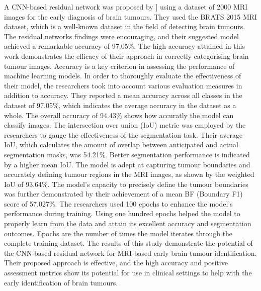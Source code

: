 \documentclass[12pt, a4paper,twoside]{report}
\theoremstyle{plain} %
\theoremstyle{definition} %
\theoremstyle{remark} %
\numberwithin{equation}{chapter}
\begin{document}
A CNN-based residual network was proposed by \cite{obeidavi22}] using a dataset of 2000 MRI images for the early diagnosis of brain tumours. They used the BRATS 2015 MRI dataset, which is a well-known dataset in the field of detecting brain tumours. The residual networks findings were encouraging, and their suggested model achieved a remarkable accuracy of 97.05\%. The high accuracy attained in this work demonstrates the efficacy of their approach in correctly categorising brain tumour images. Accuracy is a key criterion in assessing the performance of machine learning models. In order to thoroughly evaluate the effectiveness of their model, the researchers took into account various evaluation measures in addition to accuracy. They reported a mean accuracy across all classes in the dataset of 97.05\%, which indicates the average accuracy in the dataset as a whole. The overall accuracy of 94.43\% shows how accuratly the model can classify images. The intersection over union (IoU) metric was employed by the researchers to gauge the effectiveness of the segmentation task. Their average IoU, which calculates the amount of overlap between anticipated and actual segmentation masks, was 54.21\%. Better segmentation performance is indicated by a higher mean IoU. The model is adept at capturing tumour boundaries and accurately defining tumour regions in the MRI images, as shown by the weighted IoU of 93.64\%. The model's capacity to precisely define the tumour boundaries was further demonstrated by their achievement of a mean BF (Boundary F1) score of 57.027\%. The researchers used 100 epochs to enhance the model's performance during training. Using one hundred epochs helped the model to properly learn from the data and attain its excellent accuracy and segmentation outcomes. Epochs are the number of times the model iterates through the complete training dataset. The results of this study demonstrate the potential of the CNN-based residual network for MRI-based early brain tumour identification. Their proposed approach is effective, and the high accuracy and positive assessment metrics show its potential for use in clinical settings to help with the early identification of brain tumours.
\end{document}
